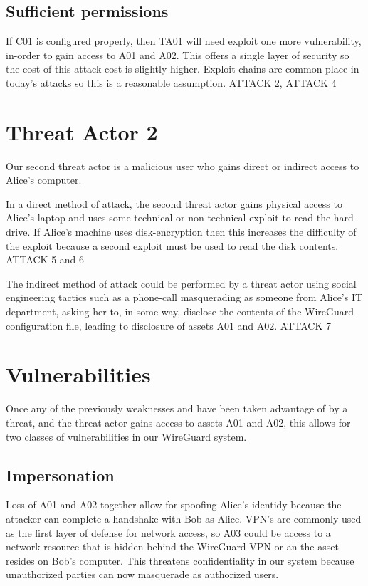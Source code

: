 \documentclass [11pt, proquest] {uwthesis}[2020/02/24]
\begin{document}
\subsection{Sufficient permissions}
If C01 is configured properly, then TA01 will need exploit one more vulnerability, in-order to gain access to A01 and A02. This offers a single layer of security so the cost of this attack cost is slightly higher. Exploit chains are common-place in today's attacks so this is a reasonable assumption.  ATTACK 2, ATTACK 4

\section{Threat Actor 2}
Our second threat actor is a malicious user who gains direct or indirect access to Alice's computer. 

In a direct method of attack, the second threat actor gains physical access to Alice's laptop and uses some technical or non-technical exploit to read the hard-drive. If Alice's machine uses disk-encryption then this increases the difficulty of the exploit because a second exploit must be used to read the disk contents.
ATTACK 5 and 6

The indirect method of attack could be performed by a threat actor using social engineering tactics such as a phone-call masquerading as someone from Alice's IT department, asking her to, in some way, disclose the contents of the WireGuard configuration file, leading to disclosure of assets A01 and A02.
ATTACK 7

\section{Vulnerabilities}
Once any of the previously weaknesses and have been taken advantage of by a threat, and the threat actor gains access to assets A01 and A02, this allows for two classes of vulnerabilities in our WireGuard system.
\subsection{Impersonation}
\label{impersonation}
Loss of A01 and A02 together allow for spoofing Alice's identidy because the attacker can complete a handshake with Bob as Alice. VPN's are commonly used as the first layer of defense for network access, so A03 could be access to a network resource that is hidden behind the WireGuard VPN or an the asset resides on Bob's computer. 
This threatens confidentiality in our system because unauthorized parties can now masquerade as authorized users.
\end{document}
